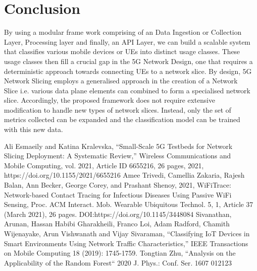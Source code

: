 \documentclass[conference]{IEEEtran}
\begin{document}
\section{Conclusion}

By using a modular frame work comprising of an Data Ingestion or Collection Layer, Processing layer and finally, an API Layer, we can build a scalable system that classifies various mobile devices or UEs into distinct usage classes. These usage classes then fill a crucial gap in the 5G Network Design, one that requires a deterministic approach towards connecting UEs to a network slice. By design, 5G Network Slicing employs a generalised approach in the creation of a Network Slice i.e. various data plane elements can combined to form a specialised network slice. Accordingly, the proposed framework does not require extensive modification to handle new types of network slices. Instead, only the set of metrics collected can be expanded and the classification model can be trained with this new data.

\begin{thebibliography}{00}
 Ali Esmaeily and Katina Kralevska, ``Small-Scale 5G Testbeds for Network Slicing Deployment: A Systematic Review,'' Wireless Communications and Mobile Computing, vol. 2021, Article ID 6655216, 26 pages, 2021, https://doi.org/10.1155/2021/6655216
 Amee Trivedi, Camellia Zakaria, Rajesh Balan, Ann Becker, George Corey, and Prashant Shenoy, 2021, WiFiTrace: Network-based Contact Tracing for Infectious Diseases Using Passive WiFi Sensing, Proc. ACM Interact. Mob. Wearable Ubiquitous Technol. 5, 1, Article 37 (March 2021), 26 pages. DOI:https://doi.org/10.1145/3448084
 Sivanathan, Arunan, Hassan Habibi Gharakheili, Franco Loi, Adam Radford, Chamith Wijenayake, Arun Vishwanath and Vijay Sivaraman, ``Classifying IoT Devices in Smart Environments Using Network Traffic Characteristics,'' IEEE Transactions on Mobile Computing 18 (2019): 1745-1759.
Tongtian Zhu, ``Analysis on the Applicability of the Random Forest`` 2020 J. Phys.: Conf. Ser. 1607 012123
\end{thebibliography}
\vspace{12pt}
\end{document}
